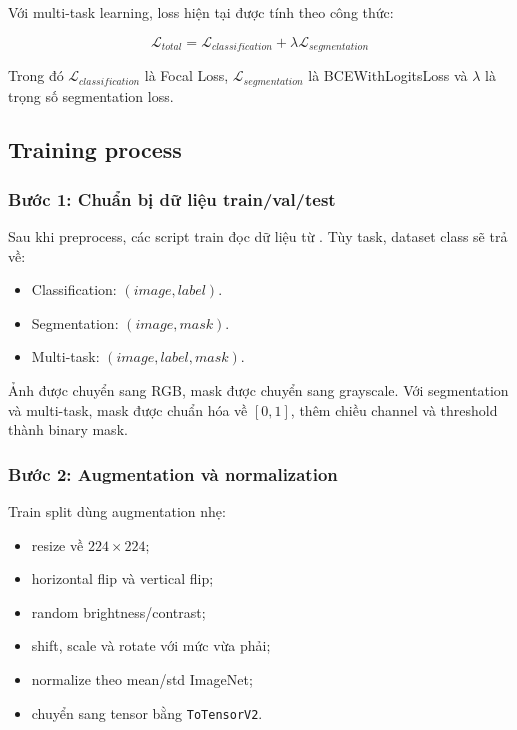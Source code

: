 \documentclass[12pt,a4paper]{article}
\begin{document}
Với multi-task learning, loss hiện tại được tính theo công thức:

\[
\mathcal{L}_{total}
= \mathcal{L}_{classification}
+ \lambda \mathcal{L}_{segmentation}
\]

Trong đó \(\mathcal{L}_{classification}\) là Focal Loss, \(\mathcal{L}_{segmentation}\) là BCEWithLogitsLoss và \(\lambda\) là trọng số segmentation loss.

\subsection{Training process}

\subsubsection*{Bước 1: Chuẩn bị dữ liệu train/val/test}

Sau khi preprocess, các script train đọc dữ liệu từ . Tùy task, dataset class sẽ trả về:

\begin{itemize}
    \item Classification: \((image, label)\).
    \item Segmentation: \((image, mask)\).
    \item Multi-task: \((image, label, mask)\).
\end{itemize}

Ảnh được chuyển sang RGB, mask được chuyển sang grayscale. Với segmentation và multi-task, mask được chuẩn hóa về \([0, 1]\), thêm chiều channel và threshold thành binary mask.

\subsubsection*{Bước 2: Augmentation và normalization}

Train split dùng augmentation nhẹ:

\begin{itemize}
    \item resize về \(224 \times 224\);
    \item horizontal flip và vertical flip;
    \item random brightness/contrast;
    \item shift, scale và rotate với mức vừa phải;
    \item normalize theo mean/std ImageNet;
    \item chuyển sang tensor bằng \texttt{ToTensorV2}.
\end{itemize}
\end{document}
